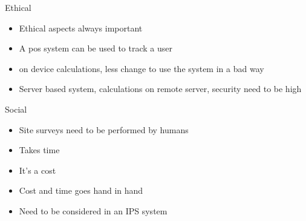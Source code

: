 \begin{block}{Ethical}
	
\begin{itemize}
\item Ethical aspects always important
\item A pos system can be used to track a user
\item on device calculations, less change to use the system in a bad way
\item Server based system, calculations on remote server, security need to be high
\end{itemize}	
\end{block}

\begin{block}{Social}
\begin{itemize}
\item Site surveys need to be performed by humans
\item Takes time
\item It's a cost
\item Cost and time goes hand in hand
\item Need to be considered in an IPS system
\end{itemize}	
\end{block}
